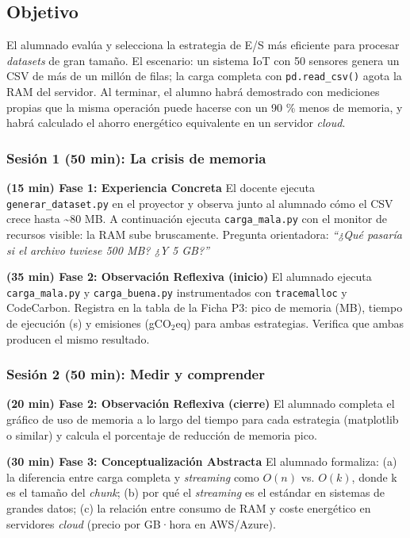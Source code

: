 \subsection{Objetivo}


El alumnado evalúa y selecciona la estrategia de E/S más eficiente para procesar \textit{datasets} de gran tamaño. El escenario: un sistema IoT con 50 sensores genera un CSV de más de un millón de filas; la carga completa con \texttt{pd.read\_csv()} agota la RAM del servidor. Al terminar, el alumno habrá demostrado con mediciones propias que la misma operación puede hacerse con un 90 \% menos de memoria, y habrá calculado el ahorro energético equivalente en un servidor \textit{cloud}.


\subsubsection{Sesión 1 (50 min): La crisis de memoria}


\textbf{(15 min) Fase 1: Experiencia Concreta} El docente ejecuta \texttt{generar\_dataset.py} en el proyector y observa junto al alumnado cómo el CSV crece hasta \textasciitilde{}80 MB. A continuación ejecuta \texttt{carga\_mala.py} con el monitor de recursos visible: la RAM sube bruscamente. Pregunta orientadora: \textit{``¿Qué pasaría si el archivo tuviese 500 MB? ¿Y 5 GB?''}


\textbf{(35 min) Fase 2: Observación Reflexiva (inicio)} El alumnado ejecuta \texttt{carga\_mala.py} y \texttt{carga\_buena.py} instrumentados con \texttt{tracemalloc} y CodeCarbon. Registra en la tabla de la Ficha P3: pico de memoria (MB), tiempo de ejecución (s) y emisiones (gCO$_2$eq) para ambas estrategias. Verifica que ambas producen el mismo resultado.




\subsubsection{Sesión 2 (50 min): Medir y comprender}


\textbf{(20 min) Fase 2: Observación Reflexiva (cierre)} El alumnado completa el gráfico de uso de memoria a lo largo del tiempo para cada estrategia (matplotlib o similar) y calcula el porcentaje de reducción de memoria pico.


\textbf{(30 min) Fase 3: Conceptualización Abstracta} El alumnado formaliza: (a) la diferencia entre carga completa y \textit{streaming} como $O(n)$ vs. $O(k)$, donde k es el tamaño del \textit{chunk}; (b) por qué el \textit{streaming} es el estándar en sistemas de grandes datos; (c) la relación entre consumo de RAM y coste energético en servidores \textit{cloud} (precio por GB·hora en AWS/Azure).




